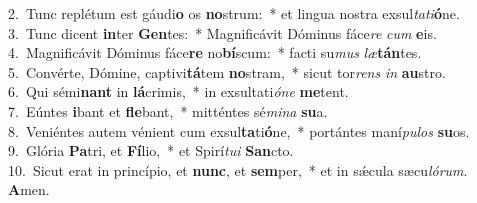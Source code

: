 {2.~}Tunc replétum est gáudi\textbf{o} os \textbf{no}strum:~* et lingua nostra exsul\textit{ta}\textit{ti}\textbf{ó}ne.\\
{3.~}Tunc dicent \textbf{in}ter \textbf{Gen}tes:~* Magnificávit Dóminus fáce\textit{re} \textit{cum} \textbf{e}is.\\
{4.~}Magnificávit Dóminus fáce\textbf{re} no\textbf{bí}scum:~* facti su\textit{mus} \textit{læ}\textbf{tán}tes.\\
{5.~}Convérte, Dómine, captivi\textbf{tá}tem \textbf{no}stram,~* sicut tor\textit{rens} \textit{in} \textbf{au}stro.\\
{6.~}Qui sémi\textbf{nant} in \textbf{lá}crimis,~* in exsultati\textit{ó}\textit{ne} \textbf{me}tent.\\
{7.~}Eúntes \textbf{i}bant et \textbf{fle}bant,~* mitténtes sé\textit{mi}\textit{na} \textbf{su}a.\\
{8.~}Veniéntes autem vénient cum exsul\textbf{ta}ti\textbf{ó}ne,~* portántes maní\textit{pu}\textit{los} \textbf{su}os.\\
{9.~}Glória \textbf{Pa}tri, et \textbf{Fí}lio,~* et Spirí\textit{tu}\textit{i} \textbf{San}cto.\\
{10.~}Sicut erat in princípio, et \textbf{nunc}, et \textbf{sem}per,~* et in sǽcula sæcu\textit{ló}\textit{rum}. \textbf{A}men.\\
